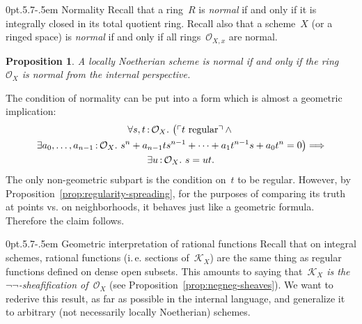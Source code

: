 \documentclass[10pt,reqno,a4paper]{amsbook}
\makeatletter
\theoremstyle{definition}
\theoremstyle{plain}
\newtheorem{prop}[defn]{Proposition}
\theoremstyle{remark}
\renewcommand{\O}{\mathcal{O}}
\newcommand{\K}{\mathcal{K}}
\newcommand{\?}{\,{:}\,}
\renewcommand{\_}{\mathpunct{.}\,}
\newcommand{\speak}[1]{\ulcorner\text{\textnormal{#1}}\urcorner}
\newcommand{\ie}{i.\,e.\@\xspace}
\newcommand{\vs}{vs.\@\xspace}
\renewenvironment{proof}[1][\proofname]{\par
  \pushQED{\qed}%
  \normalfont \topsep6\p@\@plus6\p@\relax
  \trivlist
  \item[\hskip\labelsep
        \itshape
    #1\@addpunct{.}]\ignorespaces
}{%
  \popQED\endtrivlist\@endpefalse
}
\def\subsection{\@startsection{subsection}{2}%
  {0pt}{.5\linespacing\@plus.7\linespacing}{-.5em}%
  {\normalfont\bfseries}}
\makeatother
\begin{document}
\subsection{Normality}\label{sect:normality}
Recall that a ring~$R$ is \emph{normal} if and only if
it is integrally closed in its total quotient ring. Recall also that a
scheme~$X$ (or a ringed space) is \emph{normal} if and only if all
rings~$\O_{X,x}$ are normal.

\begin{prop}\label{prop:normal-int-ext}A locally Noetherian scheme is normal if and only if the
ring~$\O_X$ is normal from the internal perspective.\end{prop}
\begin{proof}The condition of normality can be put into a form which is almost
a geometric implication:
\begin{multline*}
  \forall s,t\?\O_X\_
  \bigl(\speak{$t$ regular} \wedge {} \\
  \exists a_0,\ldots,a_{n-1}\?\O_X\_
  s^n + a_{n-1} t s^{n-1} + \cdots + a_1 t^{n-1} s + a_0 t^n = 0\bigr)
  \Longrightarrow \\
  \exists u\?\O_X\_ s = ut.
\end{multline*}
The only non-geometric subpart is the condition on~$t$ to be regular. However,
by Proposition~\ref{prop:regularity-spreading}, for the purposes of comparing
its truth at points \vs on neighborhoods, it behaves just like a geometric
formula. Therefore the claim follows.
\end{proof}


\subsection{Geometric interpretation of rational functions} Recall that on
integral schemes, rational functions (\ie sections of~$\K_X$) are the same
thing as regular functions defined on dense open subsets. This amounts to
saying that~\emph{$\K_X$ is the~$\neg\neg$-sheafification of~$\O_X$}
(see Proposition~\ref{prop:negneg-sheaves}). We want to rederive this result,
as far as possible in the internal language, and generalize it to arbitrary
(not necessarily locally Noetherian) schemes.
\end{document}
